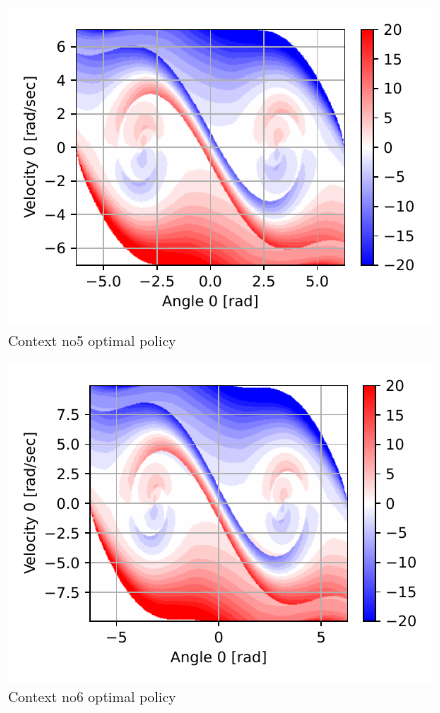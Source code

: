 \begin{figure}[p]
\begin{center}
\includegraphics[width=0.99\linewidth]{fig/c5_policy.pdf}
\caption{Context no5 optimal policy}\label{fig:c5_policy}
\end{center}
\end{figure}

\begin{figure}[p]
\begin{center}
\includegraphics[width=0.99\linewidth]{fig/c6_policy.pdf}
\caption{Context no6 optimal policy}\label{fig:c6_policy}
\end{center}
\end{figure}

